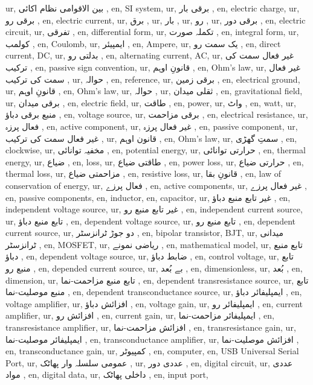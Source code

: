 ur, بین الاقوامی نظام اکائی ,
en, SI system,
ur, برقی بار ,
en, electric charge,
ur, برقی رو ,
en, electric current,
ur, برق ,
ur, بار ,
ur, رو ,
ur, برقی دور ,
en, electric circuit,
ur, تفرقی ,
en, differential form,
ur, تکملہ صورت ,
en, integral form,
ur, کولمب ,
en, Coulomb,
ur, ایمپیئر ,
en, Ampere,
ur, یک سمت رو ,
en, direct current, DC,
ur, بدلتی رو ,
en, alternating current, AC,
ur, غیر فعال سمت کی ترکیب ,
en, passive sign convention,
ur, قانونِ اوہم ,
en, Ohm's law,
ur, غیر فعال سمت کی ترکیب ,
ur, حوالہ ,
en, reference,
ur, برقی زمین ,
en, electrical ground,
ur, قانونِ اوہم ,
en, Ohm's law,
ur, حوالہ ,
ur, ثقلی میدان ,
en, gravitational field,
ur, برقی میدان ,
en, electric field,
ur, طاقت ,
en, power,
ur, واٹ ,
en, watt,
ur, منبع برقی دباؤ ,
en, voltage source,
ur, برقی مزاحمت ,
en, electrical resistance,
ur, فعال پرزہ ,
en, active component,
ur, غیر فعال پرزہ ,
en, passive component,
ur, غیر فعال سمت کی ترکیب ,
ur, قانون اوہم ,
en, Ohm's law,
ur, سمتِ گھڑی ,
en, clockwise,
ur, مخفیہ توانائی ,
en, potential energy,
ur, حرارتی توانائی ,
en, thermal energy,
ur, ضیاع ,
en, loss,
ur, طاقتی ضیاع ,
en, power loss,
ur, حرارتی ضیاع ,
en, thermal loss,
ur, مزاحمتی ضیاع ,
en, resistive loss,
ur, قانونِ بقا ,
en, law of conservation of energy,
ur, فعال پرزے ,
en, active components,
ur, غیر فعال پرزے ,
en, passive components,
en, inductor,
en, capacitor,
ur, غیر تابع منبع دباؤ ,
en, independent voltage source,
ur, غیر تابع منبع رو ,
en, independent current source,
ur, تابع منبع دباؤ ,
en, dependent voltage source,
ur, تابع منبع رو ,
en, dependent current source,
ur, دو جوڑ ٹرانزسٹر ,
en, bipolar transistor, BJT,
ur, میدانی ٹرانزسٹر ,
en, MOSFET,
ur, ریاضی نمونے ,
en, mathematical model,
ur, تابع منبع دباؤ ,
en, dependent voltage source,
ur, ضابط دباؤ ,
en, control voltage,
ur, تابع منبع رو ,
en, depended current source,
ur, بے بُعد ,
en, dimensionless,
ur, بُعد ,
en, dimension,
ur, تابع منبع مزاحمت-نما ,
en, dependent transresistance source,
ur, تابع منبع موصلیت-نما ,
en, dependent transconductance source,
ur, ایمپلیفائر دباؤ ,
en, voltage amplifier,
ur, افزائش دباؤ ,
en, voltage gain,
ur, ایمپلیفائر رو ,
en, current amplifier,
ur, افزائش رو ,
en, current gain,
ur, ایمپلیفائر مزاحمت-نما ,
en, transresistance amplifier,
ur, افزائش مزاحمت-نما ,
en, transresistance gain,
ur, ایمپلیفائر موصلیت-نما ,
en, transconductance amplifier,
ur, افزائش موصلیت-نما ,
en, transconductance gain,
ur, کمپیوٹر ,
en, computer,
en, USB Universal Serial Port,
ur, عمومی سلسلہ وار پھاٹک ,
ur, عددی دور ,
en, digital circuit,
ur, عددی مواد ,
en, digital data,
ur, داخلی پھاٹک ,
en, input port,
